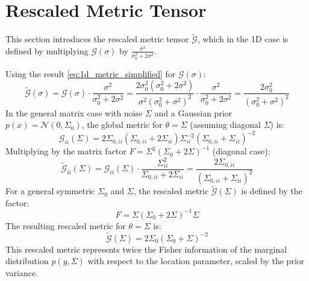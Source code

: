 \documentclass{article}
\begin{document}
\section{Rescaled Metric Tensor}
This section introduces the rescaled metric tensor $\widetilde{\mathcal{G}}$, which in the 1D case is defined by multiplying $\mathcal{G}(\sigma)$ by $\frac{\sigma^2}{\sigma_0^2 + 2\sigma^2}$.

Using the result \eqref{eq:1d_metric_simplified} for $\mathcal{G}(\sigma)$:
\begin{equation} \label{eq:rescaled_1d}
    \widetilde{\mathcal{G}}(\sigma) = \mathcal{G}(\sigma) \cdot \frac{\sigma^2}{\sigma_0^2 + 2\sigma^2} = \frac{2\sigma_0^2 (\sigma_0^2 + 2\sigma^2)}{\sigma^2 (\sigma_0^2 + \sigma^2)^2} \cdot \frac{\sigma^2}{\sigma_0^2 + 2\sigma^2} = \frac{2\sigma_0^2}{(\sigma_0^2 + \sigma^2)^2}
\end{equation}
In the general matrix case with noise $\Sigma$ and a Gaussian prior $p(x) = \mathcal{N}(0, \Sigma_0)$, the global metric for $\theta = \Sigma$ (assuming diagonal $\Sigma$) is:
\begin{equation} \label{eq:matrix_metric_diagonal}
    \mathcal{G}_{ii}(\Sigma) = 2 \Sigma_{0,ii} (\Sigma_{0,ii} + 2\Sigma_{ii}) \Sigma_{ii}^{-2} (\Sigma_{0,ii} + \Sigma_{ii})^{-2}
\end{equation}
Multiplying by the matrix factor $F = \Sigma^2 (\Sigma_0 + 2\Sigma)^{-1}$ (diagonal case):
\begin{equation} \label{eq:rescaled_matrix_diagonal}
    \widetilde{\mathcal{G}}_{ii}(\Sigma) = \mathcal{G}_{ii}(\Sigma) \cdot \frac{\Sigma_{ii}^2}{\Sigma_{0,ii} + 2\Sigma_{ii}} = \frac{2\Sigma_{0,ii}}{(\Sigma_{0,ii} + \Sigma_{ii})^2}
\end{equation}
For a general symmetric $\Sigma_0$ and $\Sigma$, the rescaled metric $\widetilde{\mathcal{G}}(\Sigma)$ is defined by the factor:
\begin{equation} \label{eq:matrix_factor}
    F = \Sigma (\Sigma_0 + 2\Sigma)^{-1} \Sigma
\end{equation}
The resulting rescaled metric for $\theta = \Sigma$ is:
\begin{equation} \label{eq:rescaled_matrix_general}
    \widetilde{\mathcal{G}}(\Sigma) = 2 \Sigma_0 (\Sigma_0 + \Sigma)^{-2}
\end{equation}
This rescaled metric represents twice the Fisher information of the marginal distribution $p(y, \Sigma)$ with respect to the location parameter, scaled by the prior variance.
\end{document}
